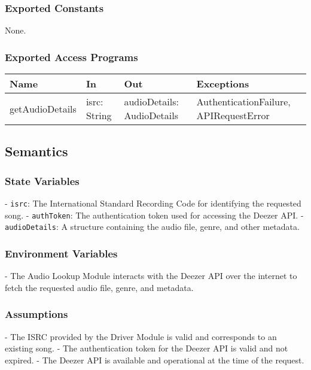 \documentclass[12pt, titlepage]{article}
\begin{document}
\subsubsection{Exported Constants}
None.

\subsubsection{Exported Access Programs}

\begin{center}
\begin{tabular}{p{2cm} p{4cm} p{4cm} p{2cm}}
\hline
\textbf{Name} & \textbf{In} & \textbf{Out} & \textbf{Exceptions} \\
\hline
getAudioDetails & isrc: String & audioDetails: AudioDetails & AuthenticationFailure, APIRequestError \\
\hline
\end{tabular}
\end{center}

\subsection{Semantics}

\subsubsection{State Variables}
- \texttt{isrc}: The International Standard Recording Code for identifying the requested song.
- \texttt{authToken}: The authentication token used for accessing the Deezer API.
- \texttt{audioDetails}: A structure containing the audio file, genre, and other metadata.

\subsubsection{Environment Variables}
- The Audio Lookup Module interacts with the Deezer API over the internet to fetch the requested audio file, genre, and metadata.

\subsubsection{Assumptions}
- The ISRC provided by the Driver Module is valid and corresponds to an existing song.
- The authentication token for the Deezer API is valid and not expired.
- The Deezer API is available and operational at the time of the request.
\end{document}
